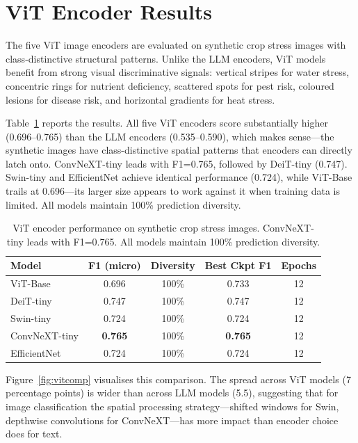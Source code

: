 \documentclass[12pt, a4paper, oneside]{Thesis}
\begin{document}
\clearpage
\section{ViT Encoder Results}

The five ViT image encoders are evaluated on synthetic crop stress images with class-distinctive structural patterns. Unlike the LLM encoders, ViT models benefit from strong visual discriminative signals: vertical stripes for water stress, concentric rings for nutrient deficiency, scattered spots for pest risk, coloured lesions for disease risk, and horizontal gradients for heat stress.

Table~\ref{tab:vitres} reports the results. All five ViT encoders score substantially higher (0.696--0.765) than the LLM encoders (0.535--0.590), which makes sense---the synthetic images have class-distinctive spatial patterns that encoders can directly latch onto. ConvNeXT-tiny leads with F1=0.765, followed by DeiT-tiny (0.747). Swin-tiny and EfficientNet achieve identical performance (0.724), while ViT-Base trails at 0.696---its larger size appears to work against it when training data is limited. All models maintain 100\% prediction diversity.

\begin{table}[htbp]\centering
\small
\begin{tabular}{lcccc}
\toprule
\textbf{Model} & \textbf{F1 (micro)} & \textbf{Diversity} & \textbf{Best Ckpt F1} & \textbf{Epochs}\\
\midrule
ViT-Base      & 0.696 & 100\% & 0.733 & 12 \\
DeiT-tiny     & 0.747 & 100\% & 0.747 & 12 \\
Swin-tiny     & 0.724 & 100\% & 0.724 & 12 \\
\rowcolor{vitgreen!50}
ConvNeXT-tiny & \textbf{0.765} & 100\% & \textbf{0.765} & 12 \\
EfficientNet  & 0.724 & 100\% & 0.724 & 12 \\
\bottomrule
\end{tabular}
\caption{ViT encoder performance on synthetic crop stress images. ConvNeXT-tiny leads with F1=0.765. All models maintain 100\% prediction diversity.}
\label{tab:vitres}
\end{table}

Figure~\ref{fig:vitcomp} visualises this comparison. The spread across ViT models (7 percentage points) is wider than across LLM models (5.5), suggesting that for image classification the spatial processing strategy---shifted windows for Swin, depthwise convolutions for ConvNeXT---has more impact than encoder choice does for text.
\end{document}
